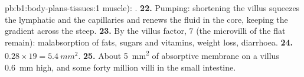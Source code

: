 \begin{solution}{pb:b1:body-plans-tissues:1}
muscle): .
\textbf{22.} Pumping: shortening the villus squeezes the lymphatic and
the capillaries and renews the fluid in the core, keeping the gradient
across the  steep.
\textbf{23.} By the villus factor, $7$ (the microvilli of the flat
 remain): malabsorption of fats, sugars and vitamins, weight
loss, diarrhoea.
\textbf{24.} $0.28\times 19 = \qty{5.4}{mm^2}$.
\textbf{25.} About \qty{5}{mm^2} of absorptive membrane on a villus
\qty{0.6}{mm} high, and some forty million villi in the small
intestine.
\end{solution}
